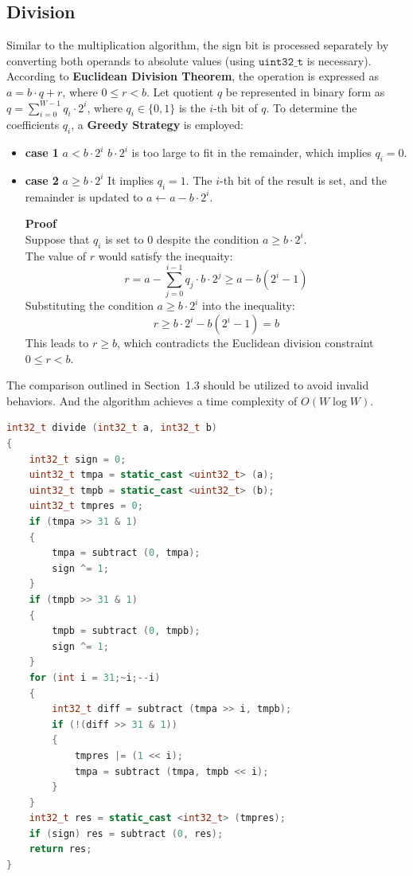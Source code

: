 \documentclass[11pt]{article}
\begin{document}
\subsection{Division}
Similar to the multiplication algorithm, the sign bit is processed separately by converting both operands to absolute values (using $\texttt{uint32\_t}$ is necessary). 
\vspace{3pt}\\
According to \textbf{Euclidean Division Theorem}, the operation is expressed as $a = b \cdot q + r$, where $0 \le r < b$. Let quotient $q$ be represented in binary form as $q = \sum\limits_{i=0}^{W - 1} q_i \cdot 2^i$, where $q_i \in \{0, 1\}$ is the $i$-th bit of $q$. To determine the coefficients $q_i$, a \textbf{Greedy Strategy} is employed:
\begin{itemize}
  \item \textbf{case 1} $a < b \cdot 2^i$ \quad $b \cdot 2^i$ is too large to fit in the remainder, which implies $q_i = 0$.
  \item \textbf{case 2} $a \ge b \cdot 2^i$ \quad It implies $q_i = 1$. The $i$-th bit of the result is set, and the remainder is updated to $a \leftarrow a - b \cdot 2^i$.

  \textbf{Proof} 
  \vspace{3pt}\\
  Suppose that $q_i$ is set to 0 despite the condition $a \ge b \cdot 2^i$. 
  \vspace{3pt}\\
  The value of $r$ would satisfy the inequaity:
  \[r = a - \sum_{j=0}^{i-1} q_j \cdot b \cdot 2^j \ge a - b(2^i - 1)\]
  Substituting the condition $a \ge b \cdot 2^i$ into the inequality:
  \[r \ge b \cdot 2^i - b(2^i - 1) = b\]
  This leads to $r \ge b$, which contradicts the Euclidean division constraint $0 \le r < b$.
\end{itemize}
The comparison outlined in Section~1.3 should be utilized to avoid invalid behaviors. And the algorithm achieves a time complexity of \textbf{$O(W \log W)$}.
\vspace{8pt}
\begin{lstlisting}[language=C++]
int32_t divide (int32_t a, int32_t b)
{
    int32_t sign = 0;
    uint32_t tmpa = static_cast <uint32_t> (a);
    uint32_t tmpb = static_cast <uint32_t> (b);
    uint32_t tmpres = 0;
    if (tmpa >> 31 & 1) 
    {
        tmpa = subtract (0, tmpa);
        sign ^= 1;
    }
    if (tmpb >> 31 & 1)
    {
        tmpb = subtract (0, tmpb);
        sign ^= 1;
    }
    for (int i = 31;~i;--i)
    {
        int32_t diff = subtract (tmpa >> i, tmpb);
        if (!(diff >> 31 & 1))
        {
            tmpres |= (1 << i);
            tmpa = subtract (tmpa, tmpb << i);
        }
    }
    int32_t res = static_cast <int32_t> (tmpres);
    if (sign) res = subtract (0, res);
    return res;
}
\end{lstlisting}
\newpage
\end{document}
